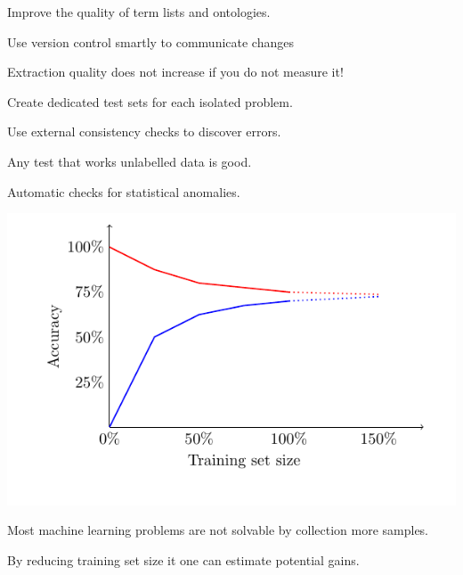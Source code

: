 \documentclass[landscape,footrule]{foils}
\begin{document}



Improve the quality of term lists and ontologies.
\begin{triangles}
\item Use version control smartly to communicate changes 
\end{triangles}
\vspace*{1.5cm}

Extraction quality does not increase if you do not measure it!
\begin{triangles}
\item Create dedicated test sets for each isolated problem.
\end{triangles}
\vspace*{1.5cm}


Use external consistency checks to discover errors. 
\begin{triangles}
\item Any test that works unlabelled data is good.
\item Automatic checks for statistical anomalies.
\end{triangles}


\centerline{\includegraphics[scale=1.5, trim= 0cm 0.0cm 0cm 0cm, clip]{performance-vs-data}}

Most machine learning problems are not solvable by collection more samples.

\begin{triangles}
\item By reducing training set size it one can estimate potential gains.
\end{triangles} 
\end{document}
